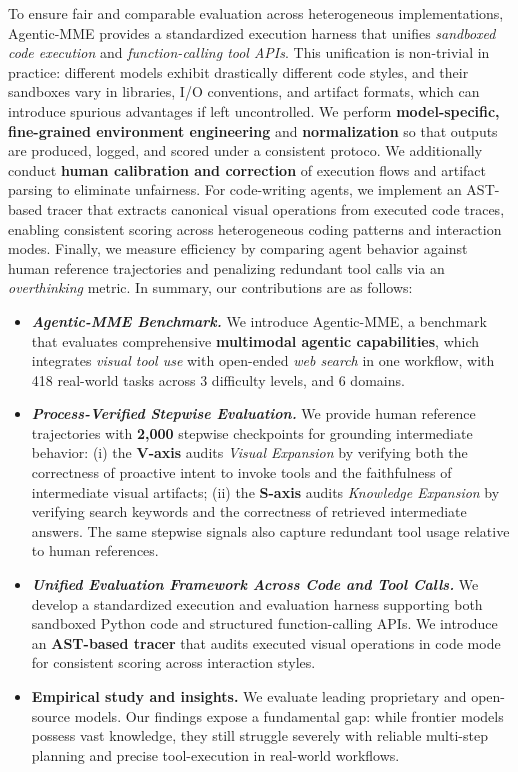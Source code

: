 \documentclass[runningheads]{llncs}
\theoremstyle{plain}
\theoremstyle{definition}
\theoremstyle{remark}
\begin{document}
To ensure fair and comparable evaluation across heterogeneous implementations, Agentic-MME provides a standardized execution harness that unifies \textit{sandboxed code execution} and \textit{function-calling tool APIs}.
This unification is non-trivial in practice: different models exhibit drastically different code styles, and their sandboxes vary in libraries, I/O conventions, and artifact formats, which can introduce spurious advantages if left uncontrolled. We perform \textbf{model-specific, fine-grained environment engineering} and \textbf{normalization} so that outputs are produced, logged, and scored under a consistent protoco. We additionally conduct \textbf{human calibration and correction} of execution flows and artifact parsing to eliminate unfairness. For code-writing agents, we implement an AST-based tracer that extracts canonical visual operations from executed code traces, enabling consistent scoring across heterogeneous coding patterns and interaction modes.
Finally, we measure efficiency by comparing agent behavior against human reference trajectories and penalizing redundant tool calls via an \textit{overthinking} metric. In summary, our contributions are as follows:
\begin{itemize}[leftmargin=*,itemsep=-0.05em,topsep=0.2em]
\item[\ding{182}] \textbf{\textit{Agentic-MME Benchmark.}}
We introduce Agentic-MME, a benchmark that evaluates comprehensive \textbf{multimodal agentic capabilities}, which integrates \textit{visual tool use} with open-ended \textit{web search} in one workflow, with 418 real-world tasks across 3 difficulty levels, and 6 domains.
\item[\ding{183}] \textbf{\textit{Process-Verified Stepwise Evaluation.}}
We provide human reference trajectories with \textbf{2,000} stepwise checkpoints for grounding intermediate behavior: (i) the \textbf{V-axis} audits \textit{Visual Expansion} by verifying both the correctness of proactive intent to invoke tools and the faithfulness of intermediate visual artifacts; (ii) the \textbf{S-axis} audits \textit{Knowledge Expansion} by verifying search keywords and the correctness of retrieved intermediate answers. The same stepwise signals also capture redundant tool usage relative to human references.
\item[\ding{184}] \textbf{\textit{Unified Evaluation Framework Across Code and Tool Calls.}}
We develop a standardized execution and evaluation harness supporting both sandboxed Python code and structured function-calling APIs. We introduce an \textbf{AST-based tracer} that audits executed visual operations in code mode for consistent scoring across interaction styles.
\item[\ding{185}] \textbf{Empirical study and insights.} We evaluate leading proprietary and open-source models. Our findings expose a fundamental gap: while frontier models possess vast knowledge, they still struggle severely with reliable multi-step planning and precise tool-execution in real-world workflows.
\end{itemize}
\end{document}
